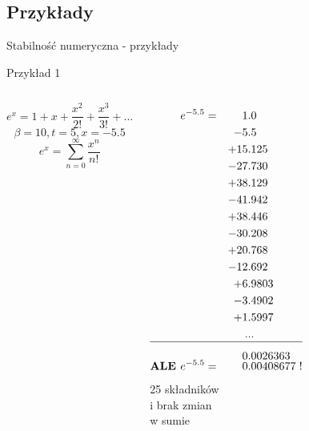 \subsection{Przykłady}
\begin{frame}{Stabilność numeryczna - przykłady}
	\begin{exampleblock}{Przykład 1}
    \fontsize{9}{9}
      \begin{columns}[T]
        \vspace{.5cm}
            \[
                e^x = 1 + x + \frac{x^2}{2!} + \frac{x^3}{3!} + ...
            \]\[
                \beta = 10, t = 5, x = -5.5
            \]\newline
            \[
            	e^{x}=\sum_{n=0}^{\infty}\frac{x^{n}}{n!}
            \]
          \begin{columns}
                  \begin{align*}
                      e^{-5.5}  	=& &   1&.0 \\
                                   & &  -5&.5 \\
                                   & & +15&.125 \\
                                   & & -27&.730 \\
                                   & & +38&.129 \\
                                   & & -41&.942 \\
                                   & & +38&.446 \\
                                   & & -30&.208 \\
                                   & & +20&.768 \\
                                   & & -12&.692 \\
                                   & &  +6&.9803 \\
                                   & &  -3&.4902 \\
                                   & &  +1&.5997 \\
                                   & & .&..\\
                                   \hline \\[-8pt]
                                   & &   0&.0026363
                  \\[-7pt]
                  \text{\bf ALE  } e^{-5.5} =& & 0&.00408677 \hspace{3pt} !
                  \end{align*}
                  25 składników \\i brak zmian \\w sumie
          \end{columns}
      \end{columns}
	\end{exampleblock}
\end{frame}
